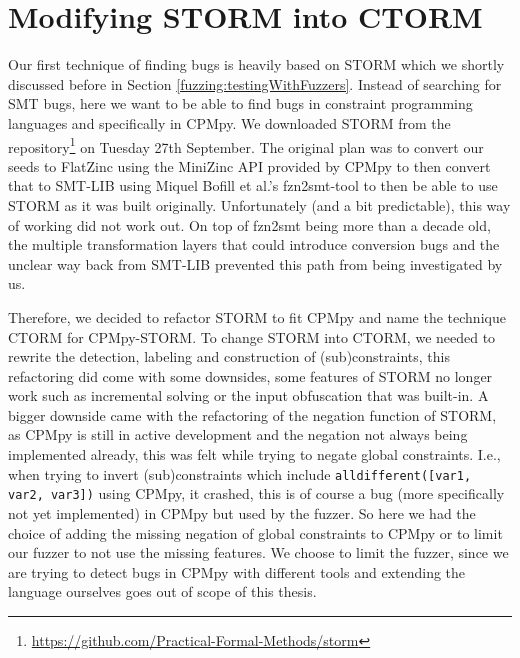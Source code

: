 \section{Modifying STORM into CTORM}
\label{impl:modifyingSTROM}
Our first technique of finding bugs is heavily based on STORM which we shortly discussed before in Section \ref{fuzzing:testingWithFuzzers}. Instead of searching for SMT bugs, here we want to be able to find bugs in constraint programming languages and specifically in CPMpy. We downloaded STORM from the repository\footnote{\url{https://github.com/Practical-Formal-Methods/storm}} on Tuesday 27th September.
The original plan was to convert our seeds to FlatZinc using the MiniZinc API provided by CPMpy to then convert that to SMT-LIB \cite{72bofill2010system} using Miquel Bofill et al.’s fzn2smt-tool to then be able to use STORM as it was built originally. Unfortunately (and a bit predictable), this way of working did not work out. On top of fzn2smt being more than a decade old, the multiple transformation layers that could introduce conversion bugs and the unclear way back from SMT-LIB prevented this path from being investigated by us.

Therefore, we decided to refactor STORM to fit CPMpy and name the technique CTORM for CPMpy-STORM. To change STORM into CTORM, we needed to rewrite the detection, labeling and construction of (sub)constraints, this refactoring did come with some downsides, some features of STORM no longer work such as incremental solving or the input obfuscation that was built-in. A bigger downside came with the refactoring of the negation function of STORM, as CPMpy is still in active development and 
the negation not always being implemented already, this was felt while trying to negate global constraints. I.e., when trying to invert (sub)constraints which include \texttt{alldifferent([var1, var2, var3])} using CPMpy, it crashed, this is of course a bug (more specifically not yet implemented) in CPMpy but used by the fuzzer. So here we had the choice of adding the missing negation of global constraints to CPMpy or to limit our fuzzer to not use the missing features. We choose to limit the fuzzer, since we are trying to detect bugs in CPMpy with different tools and extending the language ourselves goes out of scope of this thesis. 



